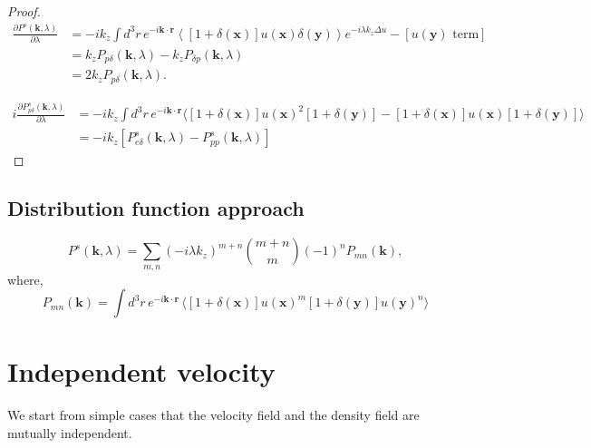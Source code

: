 \documentclass[a4paper,11pt, fleqn]{article}
\begin{document}
\begin{proof}
\begin{equation}\begin{split}
  \frac{\partial P^s(\bm{k}, \lambda)}{\partial \lambda}
  &= -ik_z \int \! d^3r \, e^{-i\bm{k}\cdot\bm{r}} \left\langle
       [1 + \delta(\bm{x})] u(\bm{x}) \delta(\bm{y}) \right\rangle
       e^{-i\lambda k_z \Delta u}
       - [u(\bm{y}) \mbox{ term}]\\
  &= k_z P_{p\delta}(\bm{k}, \lambda) - k_z P_{\delta p}(\bm{k}, \lambda)\\
  &= 2k_z P_{p\delta}(\bm{k}, \lambda).
\end{split}\end{equation}

\begin{equation}\begin{split}
  i \frac{\partial P_{p\delta}^s(\bm{k}, \lambda)}{\partial \lambda}
  &= -ik_z \int\! d^3 r \, e^{-i\bm{k}\cdot\bm{r}} \Big\langle
  [1 + \delta(\bm{x})]u(\bm{x})^2 [ 1 + \delta(\bm{y}) ]
  - [1 + \delta(\bm{x})]u(\bm{x}) [ 1 + \delta(\bm{y}) ]
  \Big\rangle\\
  &= -ik_z \left[ P^s_{e\delta}(\bm{k}, \lambda) - P^s_{pp}(\bm{k}, \lambda)
    \right]
\end{split}\end{equation}
\end{proof}

\clearpage
\subsection{Distribution function approach}

\begin{equation}
  P^s(\bm{k}, \lambda) = \sum_{m,n}
    (-i\lambda k_z)^{m+n} \binom{m+n}{m} (-1)^n P_{mn}(\bm{k}),
\end{equation}
where,
\begin{equation}
  P_{mn}(\bm{k}) = \int\! \! d^3 r \, e^{-i\bm{k}\cdot\bm{r}} \, \Big\langle
         [ 1 + \delta(\bm{x}) ] u(\bm{x})^m
         [ 1 + \delta(\bm{y}) ] u(\bm{y})^n
         \Big\rangle
\end{equation}

\clearpage
%
%
\section{Independent velocity}
We start from simple cases that the velocity field and the
density field are mutually independent.
\end{document}
